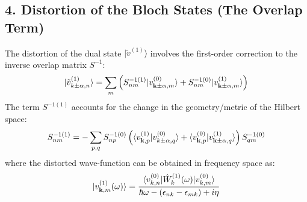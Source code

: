 \documentclass[aps,physrev,preprint,groupedaddress]{revtex4-2}
\newcommand{\kk}{{\bf k}}
\renewcommand{\[}{\left[}
\renewcommand{\]}{\right]}
\renewcommand{\(}{\left(}
\renewcommand{\)}{\right)}
\begin{document}
\subsection*{4. Distortion of the Bloch States (The Overlap Term)}
The distortion of the dual state $|\tilde{v}^{(1)}\rangle$ involves the first-order correction to the inverse overlap matrix $S^{-1}$:
\begin{equation}
|\tilde{v}_{k\pm\alpha, n}^{(1)}\rangle = \sum_{m} \left( S_{nm}^{-1 (1)} |v_{\kk\pm\alpha, m}^{(0)}\rangle + S_{nm}^{-1 (0)} |v_{\kk\pm\alpha, m}^{(1)}\rangle \right)
\end{equation}
The term $S^{-1 (1)}$ accounts for the change in the geometry/metric of the Hilbert space:
\begin{equation}
S_{nm}^{-1 (1)} = - \sum_{p,q} S_{np}^{-1 (0)} \left( \langle v_{\kk,p}^{(1)} | v_{k\pm\alpha, q}^{(0)}\rangle + \langle v_{\kk,p}^{(0)} | v_{\kk\pm\alpha, q}^{(1)}\rangle \right) S_{qm}^{-1 (0)}
\end{equation}
where the distorted wave-function can be obtained in frequency space as:
\begin{equation}
	|v_{\kk,m}^{(1)}(\omega)\rangle = \frac{\langle v_{k,n}^{(0)} |  \hat{W}_k^{(1)}(\omega) |v_{k,m}^{(0)}\rangle}{\hbar \omega -(\epsilon_{nk} -\epsilon_{mk}) + i \eta}
\end{equation}




\end{document}
